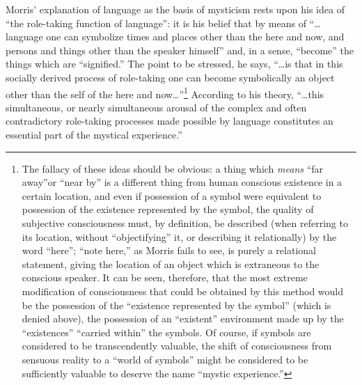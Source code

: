 Morris' explanation of language as the basis of mysticism
rests upon his idea of \enquote{the role-taking function of language}:
it is his belief that by means of \enquote{\dots language one can symbolize times
and places other than the here and now, and persons and things
other than the speaker himself}\supercite{hayakawa:language-meaning-maturity}
and, in a sense, \enquote{become} the things which are \enquote{signified.} The point
to be stressed, he says, \enquote{\dots is that in this socially derived
process of role-taking one can become symbolically an object
other than the self of the here and now\dots}\supercite{hayakawa:language-meaning-maturity}\footnote{The fallacy of these ideas should be obvious: a thing which \emph{means} \enquote{far away}or \enquote{near by} is a different thing from human conscious existence in a certain location, and even if possession of a symbol were equivalent to possession of the existence represented by the symbol, the quality of subjective consciousness must, by definition, be described (when referring to its location, without \enquote{objectifying} it, or describing it relationally) by the word \enquote{here}; \enquote{note here,} as Morris fails to see, is purely a relational statement, giving the location of an object which is extraneous to the conscious speaker. It can be seen, therefore, that the most extreme modification of consciousness that could be obtained by this method would be the possession of the \enquote{existence represented by the symbol} (which is denied above), the possession of an \enquote{existent} environment made up by the \enquote{existences} \enquote{carried within} the symbols. Of course, if symbols are considered to be transcendently valuable, the shift of consciousness from sensuous reality to a \enquote{world of symbols} might be considered to be sufficiently valuable to deserve the name \enquote{mystic experience.}}
According to his theory, \enquote{\dots this simultaneous, or nearly simultaneous arousal
of the complex and often contradictory role-taking processes made
possible by language constitutes an essential part of the mystical
experience.}\supercite{hayakawa:language-meaning-maturity}

